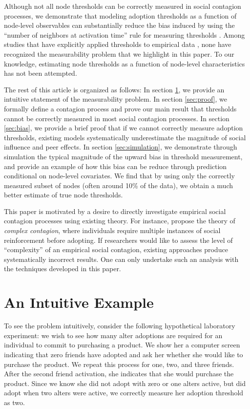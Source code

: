 \documentclass[a4paper]{article}
\begin{document}
Although not all node thresholds can be correctly measured in social contagion processes, we demonstrate that modeling adoption thresholds as a function of node-level observables can substantially reduce the bias induced by using the ``number of neighbors at activation time'' rule for measuring thresholds \parencite{Valente1996}. Among studies that have explicitly applied thresholds to empirical data \parencite{Valente1995, Valente1996, Ludemann1999a, Romero2011}, none have recognized the measurability problem that we highlight in this paper. To our knowledge, estimating node thresholds as a function of node-level characteristics has not been attempted.

The rest of this article is organized as follows: In section \ref{sec:intuition}, we provide an intuitive statement of the measurability problem. In section \ref{sec:proof}, we formally define a contagion process and prove our main result that thresholds cannot be correctly measured in most social contagion processes. In section \ref{sec:bias}, we provide a brief proof that if we cannot correctly measure adoption thresholds, existing models systematically underestimate the magnitude of social influence and peer effects. In section \ref{sec:simulation}, we demonstrate through simulation the typical magnitude of the upward bias in threshold measurement, and provide an example of how this bias can be reduce through prediction conditional on node-level covariates. We find that by using only the correctly measured subset of nodes (often around 10\% of the data), we obtain a much better estimate of true node thresholds.

This paper is motivated by a desire to directly investigate empirical social contagion processes using existing theory. For instance, \cite{Centola2007} propose the theory of \emph{complex contagion}, where individuals require multiple instances of social reinforcement before adopting. If researchers would like to assess the level of ``complexity'' of an empirical social contagion, existing approaches produce systematically incorrect results. One can only undertake such an analysis with the techniques developed in this paper.

\section{An Intuitive Example} \label{sec:intuition}

To see the problem intuitively, consider the following hypothetical laboratory experiment: we wish to see how many alter adoptions are required for an individual to commit to purchasing a product. We show her a computer screen indicating that zero friends have adopted and ask her whether she would like to purchase the product. We repeat this process for one, two, and three friends. After the second friend activation, she indicates that she would purchase the product. Since we know she did not adopt with zero or one alters active, but did adopt when two alters were active, we correctly measure her adoption threshold as two.
\end{document}
